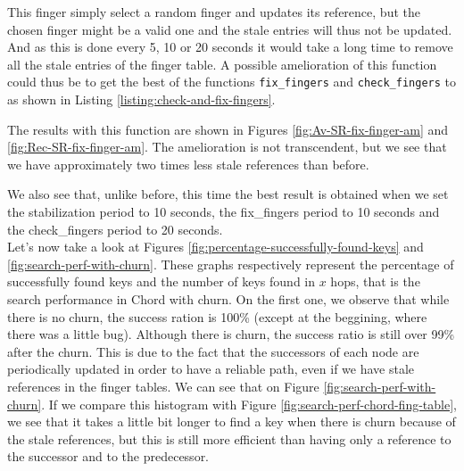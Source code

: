 \documentclass[a4paper, 11pt]{article}
\theoremstyle{plain}
\theoremstyle{definition}
\begin{document}
    

    This finger simply select a random finger and updates its reference, but the chosen finger might be a
    valid one and the stale entries will thus not be updated. And as this is done every 5, 10 or 20 seconds it
    would take a long time to remove all the stale entries of the finger table. A possible amelioration of
    this function could thus be to get the best of the functions \texttt{fix\_fingers} and
    \texttt{check\_fingers} to as shown in Listing \ref{listing:check-and-fix-fingers}.

    The results with this function are shown in Figures \ref{fig:Av-SR-fix-finger-am} and
    \ref{fig:Rec-SR-fix-finger-am}. The amelioration is not transcendent, but we see that we have
    approximately two times less stale references than before. \newpage

        


    We also see that, unlike before, this time the best result is obtained when we set the stabilization
    period to 10 seconds, the fix\_fingers period to 10 seconds and the check\_fingers period to 20
    seconds. \\

    Let's now take a look at Figures \ref{fig:percentage-successfully-found-keys} and
    \ref{fig:search-perf-with-churn}. These graphs respectively represent the percentage of successfully found
    keys and the number of keys found in $x$ hops, that is the search performance in Chord with churn. On the
    first one, we observe that while there is no churn, the success ration is 100\% (except at the beggining,
    where there was a little bug). Although there is churn, the success ratio is still over 99\% after the
    churn. This is due to the fact that the successors of each node are periodically updated in order to have
    a reliable path, even if we have stale references in the finger tables. We can see that on Figure
    \ref{fig:search-perf-with-churn}. If we compare this histogram with Figure
    \ref{fig:search-perf-chord-fing-table}, we see that it takes a little bit longer to
    find a key when there is churn because of the stale references, but this is still more efficient than
    having only a reference to the successor and to the predecessor.
\end{document}
